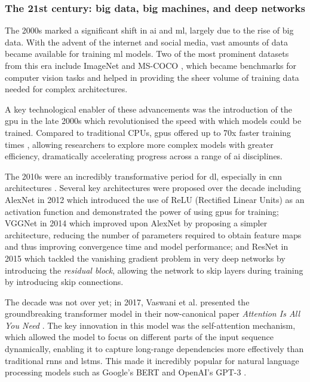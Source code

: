 \subsubsection{The 21st century: big data, big machines, and deep networks}

The 2000s marked a significant shift in \acrlong{ai} and \acrlong{ml}, largely due to the rise of big data. With the advent of the internet and social media, vast amounts of data became available for training \acrlong{ml} models. Two of the most prominent datasets from this era include ImageNet \cite{deng_imagenet_2009} and MS-COCO \cite{lin_microsoft_2014}, which became benchmarks for computer vision tasks and helped in providing the sheer volume of training data needed for complex architectures.

A key technological enabler of these advancements was the introduction of the \acrfull{gpu} in the late 2000s which revolutionised the speed with which models could be trained. Compared to traditional CPUs, \acrshort{gpu}s offered up to 70x faster training times \cite{raina_large-scale_2009}, allowing researchers to explore more complex models with greater efficiency, dramatically accelerating progress across a range of \acrlong{ai} disciplines.

The 2010s were an incredibly transformative period for \acrlong{dl}, especially in \acrshort{cnn} architectures \cite{lecun_deep_2015}. Several key architectures were proposed over the decade including AlexNet in 2012 \cite{krizhevsky_imagenet_2012} which introduced the use of ReLU (Rectified Linear Units) as an activation function and demonstrated the power of using \acrshort{gpu}s for training; VGGNet in 2014 \cite{simonyan_very_2014} which improved upon AlexNet by proposing a simpler architecture, reducing the number of parameters required to obtain feature maps and thus improving convergence time and model performance; and ResNet in 2015 \cite{he_deep_2015} which tackled the vanishing gradient problem in very deep networks by introducing the \textit{residual block}, allowing the network to skip layers during training by introducing skip connections.

The decade was not over yet; in 2017, Vaswani et al. presented the groundbreaking transformer model in their now-canonical paper \textit{Attention Is All You Need} \cite{vaswani_attention_2017}. The key innovation in this model was the self-attention mechanism, which allowed the model to focus on different parts of the input sequence dynamically, enabling it to capture long-range dependencies more effectively than traditional \acrshort{rnn}s and \acrshort{lstm}s. This made it incredibly popular for natural language processing models such as Google's BERT \cite{devlin_bert_2018} and OpenAI's GPT-3 \cite{brown_language_2020}.

